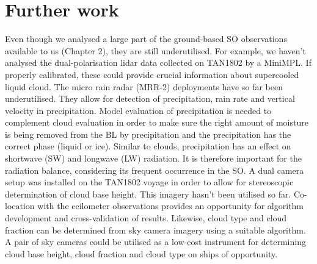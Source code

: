 \section{Further work}

Even though we analysed a large part of the ground-based SO observations
available to us (Chapter 2), they are still underutilised. For example,
we haven't analysed the dual-polarisation lidar data collected on TAN1802
by a MiniMPL. If properly calibrated, these could provide crucial information
about supercooled liquid cloud. The micro rain radar (MRR-2) deployments
have so far been underutilised. They allow for detection of precipitation,
rain rate and vertical velocity in precipitation. Model evaluation of
precipitation is needed to complement cloud evaluation in order to make
sure the right amount of moisture is being removed from the BL by precipitation
and the precipitation has the correct phase (liquid or ice). Similar to clouds,
precipitation has an effect on shortwave (SW) and longwave (LW) radiation. It is therefore important
for the radiation balance, considering its frequent occurrence in the SO.
A dual camera setup was installed on the TAN1802 voyage in order to allow
for stereoscopic determination of cloud base height. This imagery hasn't been
utilised so far. Co-location with the ceilometer observations provides an
opportunity for algorithm development and cross-validation of results.
Likewise, cloud type and cloud fraction can be determined from sky camera
imagery using a suitable algorithm. A pair of sky cameras could be utilised as
a low-cost instrument for determining cloud base height, cloud fraction
and cloud type on ships of opportunity.

